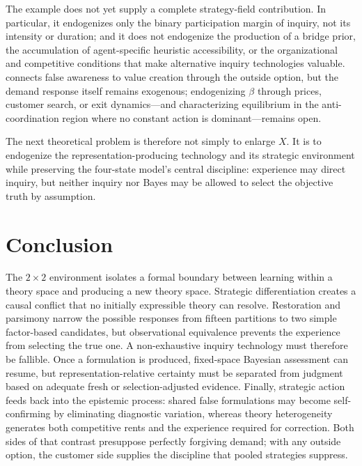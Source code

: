 \documentclass[11pt]{article}
\begin{document}
The example does not yet supply a complete strategy-field contribution.  In
particular, it endogenizes only the binary participation margin of inquiry,
not its intensity or duration; and it does not endogenize the production
of a bridge prior, the accumulation of agent-specific heuristic accessibility,
or the organizational and competitive conditions that make alternative
inquiry technologies valuable.   connects false
awareness to value creation through the outside option, but the demand
response itself remains exogenous; endogenizing $\beta$ through prices,
customer search, or exit dynamics---and characterizing equilibrium in the
anti-coordination region where no constant action is dominant---remains open.

The next theoretical problem is therefore not simply to enlarge $X$.  It is to
endogenize the representation-producing technology and its strategic
environment while preserving the four-state model's central discipline:
experience may direct inquiry, but neither inquiry nor Bayes may be allowed to
select the objective truth by assumption.

\section{Conclusion}

The $2\times2$ environment isolates a formal boundary between learning within a
theory space and producing a new theory space.  Strategic differentiation
creates a causal conflict that no initially expressible theory can resolve.
Restoration and parsimony narrow the possible responses from fifteen partitions
to two simple factor-based candidates, but observational equivalence prevents
the experience from selecting the true one.  A non-exhaustive inquiry
technology must therefore be fallible.  Once a formulation is produced,
fixed-space Bayesian assessment can resume, but representation-relative
certainty must be separated from judgment based on adequate fresh or
selection-adjusted evidence.  Finally, strategic action feeds back into the epistemic process:
shared false formulations may become self-confirming by eliminating diagnostic
variation, whereas theory heterogeneity generates both competitive rents and
the experience required for correction.  Both sides of that contrast
presuppose perfectly forgiving demand; with any outside option, the customer
side supplies the discipline that pooled strategies suppress.
\end{document}
